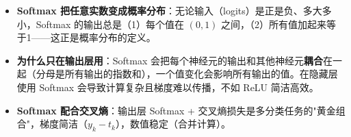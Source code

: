 \documentclass[a4paper,11pt]{ctexart}
\begin{document}
\begin{beginnerbox}
    \begin{itemize}
        \item \textbf{Softmax 把任意实数变成概率分布}：无论输入（logits）是正是负、多大多小，Softmax 的输出总是（1）每个值在 $(0,1)$ 之间，（2）所有值加起来等于1——这正是概率分布的定义。
        \item \textbf{为什么只在输出层用}：Softmax 会把每个神经元的输出和其他神经元\textbf{耦合}在一起（分母是所有输出的指数和），一个值变化会影响所有输出的值。在隐藏层使用 Softmax 会导致计算复杂且梯度难以传播，不如 ReLU 简洁高效。
        \item \textbf{Softmax 配合交叉熵}：输出层 Softmax + 交叉熵损失是多分类任务的"黄金组合"，梯度简洁（$y_k - t_k$），数值稳定（合并计算）。
    \end{itemize}
\end{beginnerbox}
\end{document}
